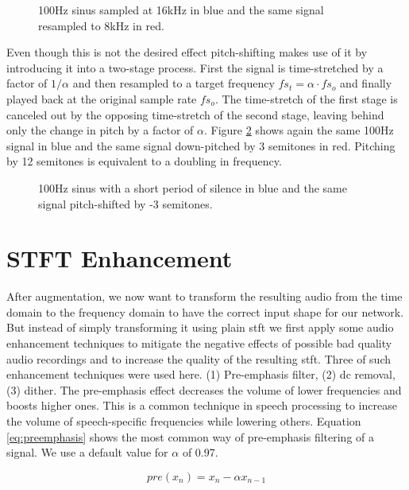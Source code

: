 \begin{figure}[H]
    \centering
    
    \caption[Resampling]{100Hz sinus sampled at 16kHz in blue and the same signal resampled to 8kHz in red.}
    \label{fig:resample}
\end{figure}

Even though this is not the desired effect pitch-shifting makes use of it by introducing it into a two-stage process. First the signal is time-stretched by a factor of $1 / \alpha$ and then resampled to a target frequency $ fs_t = \alpha \cdot fs_o$ and finally played back at the original sample rate $fs_o$. The time-stretch of the first stage is canceled out by the opposing time-stretch of the second stage, leaving behind only the change in pitch by a factor of $\alpha$. Figure \ref{fig:pitchshift} shows again the same 100Hz signal in blue and the same signal down-pitched by 3 semitones in red. Pitching by 12 semitones is equivalent to a doubling in frequency.

\begin{figure}[H]
    \centering
    
    \caption[Pitchshift]{100Hz sinus with a short period of silence in blue and the same signal pitch-shifted by -3 semitones.}
    \label{fig:pitchshift}
\end{figure}

\section{STFT Enhancement}\label{sec:enhancement}

After augmentation, we now want to transform the resulting audio from the time domain to the frequency domain to have the correct input shape for our network. But instead of simply transforming it using plain \gls{stft} we first apply some audio enhancement techniques to mitigate the negative effects of possible bad quality audio recordings and to increase the quality of the resulting \gls{stft}. Three of such enhancement techniques were used here. (1) Pre-emphasis filter, (2) \gls{dc} removal, (3) dither. The pre-emphasis effect decreases the volume of lower frequencies and boosts higher ones. This is a common technique in speech processing to increase the volume of speech-specific frequencies while lowering others. Equation \ref{eq:preemphasis} shows the most common way of pre-emphasis filtering of a signal. We use a default value for $\alpha$ of 0.97.

\begin{equation}\label{eq:preemphasis}
    pre(x_n) = x_n - \alpha x_{n-1}
\end{equation}

